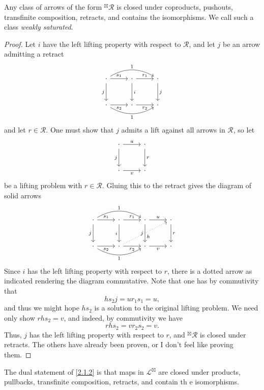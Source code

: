  \begin{lemma}\label{2.1.2}
	 Any class of arrows of the form ${}^{\boxtimes} \mathcal{R} $ is closed under coproducts, pushouts, transfinite composition, retracts, and contains the isomorphisms. We call such a class \emph{weakly saturated}.
 \end{lemma}
 \begin{proof}
 	Let $i$ have the left lifting property with respect to $\mathcal{R} $, and let $j$ be an arrow admitting a retract
	\[\begin{tikzcd}[row sep = 2.5em, column sep = 2.5em]
	\cdot \ar[" 1 ", bend left, rr] \ar[" j "', d] \ar[" s_1 ", r]  & \cdot \ar[" i ", d] \ar[" r_1 ", r]  & \cdot \ar[" j ", d]  \\
	\cdot \ar[" s_2 "', r] \ar[" 1 "', bend right, rr]  & \cdot \ar[" r_2 "', r]  & \cdot 
	\end{tikzcd}\]
	and let $r\in \mathcal{R} $. One must show that $j$ admits a lift against all arrows in $\mathcal{R} $, so let
	\[\begin{tikzcd}[row sep = 2.5em, column sep = 2.5em]
	\cdot \ar[" u ", r] \ar[" j "', d]  & \cdot \ar[" r ", d]  \\
	\cdot \ar[" v "', r]  & \cdot 
	\end{tikzcd}\]
	be a lifting problem with $r\in\mathcal{R} $. Gluing this to the retract gives the diagram of solid arrows
	\[\begin{tikzcd}[row sep = 2.5em, column sep = 2.5em]
	\cdot \ar[" s_1 ", r] \ar[" 1 ", bend left, rr] \ar[" j "', d]  & \cdot \ar[" r_1 ", r] \ar[" i "', d]  & \cdot \ar[" u ", r] \ar[" j "', d]  & \cdot \ar[" r ", d]  \\
	\cdot \ar[" s_2 "', r] \ar[" 1 "', bend right, rr]  & \cdot \ar[" r_2 "', r] \ar[" h "', dotted, urr]  & \cdot \ar[" v "', r]  & \cdot 
	\end{tikzcd}\]
	Since $i$ has the left lifting property with respect to $r$, there is a dotted arrow as indicated rendering the diagram commutative. Note that one has by commutivity that
	\[
		hs_2j=ur_1s_1=u,
	\]
	and thus we might hope $hs_2$ is a solution to the original lifting problem. We need only show $rhs_2=v$, and indeed, by commutivity we have
	\[
		rhs_2=vr_2s_2=v
	.\]
	Thus, $j$ has the left lifting property with respect to $r$, and ${}^{\boxtimes} \mathcal{R} $ is closed under retracts. The others have already been proven, or I don't feel like proving them.
 \end{proof}
 
 \begin{remark}\label{2.1.3}
	 The dual statement of \cref{2.1.2} is that maps in $\mathcal{L} ^{\boxtimes} $ are closed under products, pullbacks, transfinite composition, retracts, and contain th e isomorphisms.
 \end{remark}
 
